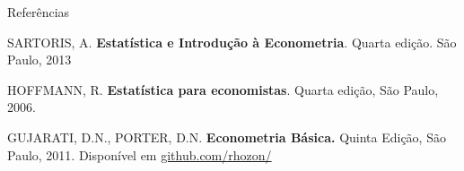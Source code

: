 \documentclass{beamer}
\begin{document}
\begin{frame}{Referências}
\footnotesize
\begin{thebibliography}{}

 SARTORIS, A. \textbf{Estatística e Introdução à Econometria}. Quarta edição. São Paulo, 2013

 HOFFMANN, R. \textbf{Estatística para economistas}. Quarta edição, São Paulo, 2006.

 GUJARATI, D.N., PORTER, D.N. \textbf{Econometria Básica.} Quinta Edição, São Paulo, 2011. Disponível em \href{https://github.com/rhozon/Livros-Econometria/blob/master/Econometria\%20-\%20Damodar\%20N.\%20Gujarati\%20e\%20Dawn\%20C.\%20Porter.pdf}{github.com/rhozon/}

\end{thebibliography}
\end{frame}







\end{document}
